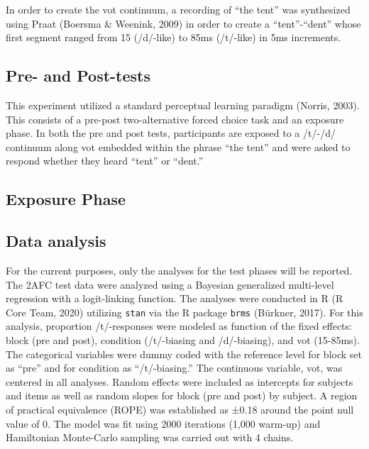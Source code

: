 \documentclass[
  english,
  man]{apa6}
\begin{document}
In order to create the vot continuum, a recording of ``the tent'' was synthesized using Praat (Boersma \& Weenink, 2009) in order to create a ``tent''-``dent'' whose first segment ranged from 15 (/d/-like) to 85ms (/t/-like) in 5ms increments.

\hypertarget{pre--and-post-tests}{%
\subsection{Pre- and Post-tests}\label{pre--and-post-tests}}

This experiment utilized a standard perceptual learning paradigm (Norris, 2003). This consists of a pre-post two-alternative forced choice task and an exposure phase. In both the pre and post tests, participants are exposed to a /t/-/d/ continuum along vot embedded within the phrase ``the tent'' and were asked to respond whether they heard ``tent'' or ``dent.''

\hypertarget{exposure-phase}{%
\subsection{Exposure Phase}\label{exposure-phase}}

\hypertarget{data-analysis}{%
\subsection{Data analysis}\label{data-analysis}}

For the current purposes, only the analyses for the test phases will be reported. The 2AFC test data were analyzed using a Bayesian generalized multi-level regression with a logit-linking function. The analyses were conducted in R (R Core Team, 2020) utilizing \texttt{stan} via the R package \texttt{brms} (Bürkner, 2017). For this analysis, proportion /t/-responses were modeled as function of the fixed effects: block (pre and post), condition (/t/-biasing and /d/-biasing), and vot (15-85ms). The categorical variables were dummy coded with the reference level for block set as ``pre'' and for condition as ``/t/-biasing.'' The continuous variable, vot, was centered in all analyses. Random effects were included as intercepts for subjects and items as well as random slopes for block (pre and post) by subject. A region of practical equivalence (ROPE) was established as ±0.18 around the point null value of 0. The model was fit using 2000 iterations (1,000 warm-up) and Hamiltonian Monte-Carlo sampling was carried out with 4 chains.
\end{document}
